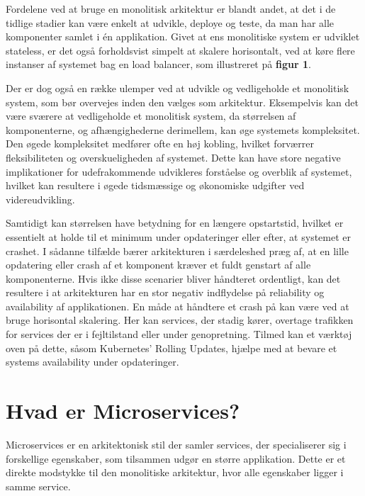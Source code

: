\documentclass{article}
\begin{document}
\begin{flushleft}
Fordelene ved at bruge en monolitisk arkitektur er blandt andet, at det i de tidlige stadier kan være enkelt at udvikle, deploye og teste, da man har alle komponenter samlet i én applikation.\cite{mono1} Givet at ens monolitiske system er udviklet stateless, er det også forholdsvist simpelt at skalere horisontalt, ved at køre flere instanser af systemet bag en load balancer, som illustreret på \textbf{figur 1}.\cite{mono2} \linebreak

Der er dog også en række ulemper ved at udvikle og vedligeholde et monolitisk system, som bør overvejes inden den vælges som arkitektur. Eksempelvis kan det være sværere at vedligeholde et monolitisk system, da størrelsen af komponenterne, og afhængighederne derimellem, kan øge systemets kompleksitet. Den øgede kompleksitet medfører ofte en høj kobling, hvilket forværrer fleksibiliteten og overskueligheden af systemet.\cite{mono3} Dette kan have store negative implikationer for udefrakommende udvikleres forståelse og overblik af systemet, hvilket kan resultere i øgede tidsmæssige og økonomiske udgifter ved videreudvikling.\cite{mono4} \linebreak

Samtidigt kan størrelsen have betydning for en længere opstartstid, hvilket er essentielt at holde til et minimum under opdateringer eller efter, at systemet er crashet. I sådanne tilfælde bærer arkitekturen i særdeleshed præg af, at en lille opdatering eller crash af et komponent kræver et fuldt genstart af alle komponenterne.\cite{mono5} Hvis ikke disse scenarier bliver håndteret ordentligt, kan det resultere i at arkitekturen har en stor negativ indflydelse på reliability og availability af applikationen. En måde at håndtere et crash på kan være ved at bruge horisontal skalering. Her kan services, der stadig kører, overtage trafikken for services der er i fejltilstand eller under genopretning. Tilmed kan et værktøj oven på dette, såsom Kubernetes’ Rolling Updates\cite{micro2}, hjælpe med at bevare et systems availability under opdateringer. 

\section*{Hvad er Microservices?}
Microservices er en arkitektonisk stil der samler services, der specialiserer sig i forskellige egenskaber, som tilsammen udgør en større applikation. Dette er et direkte modstykke til den monolitiske arkitektur, hvor alle egenskaber ligger i samme service.\linebreak


\end{flushleft}
\end{document}
